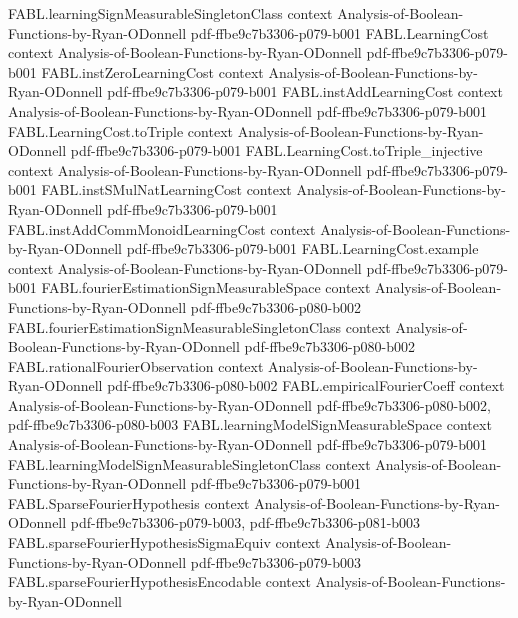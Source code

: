 \begin{theorem}
\proofstep
  {FABL.learningSignMeasurableSingletonClass}
  {context}
  {Analysis-of-Boolean-Functions-by-Ryan-ODonnell}
  {pdf-ffbe9c7b3306-p079-b001}
\proofstep
  {FABL.LearningCost}
  {context}
  {Analysis-of-Boolean-Functions-by-Ryan-ODonnell}
  {pdf-ffbe9c7b3306-p079-b001}
\proofstep
  {FABL.instZeroLearningCost}
  {context}
  {Analysis-of-Boolean-Functions-by-Ryan-ODonnell}
  {pdf-ffbe9c7b3306-p079-b001}
\proofstep
  {FABL.instAddLearningCost}
  {context}
  {Analysis-of-Boolean-Functions-by-Ryan-ODonnell}
  {pdf-ffbe9c7b3306-p079-b001}
\proofstep
  {FABL.LearningCost.toTriple}
  {context}
  {Analysis-of-Boolean-Functions-by-Ryan-ODonnell}
  {pdf-ffbe9c7b3306-p079-b001}
\proofstep
  {FABL.LearningCost.toTriple_injective}
  {context}
  {Analysis-of-Boolean-Functions-by-Ryan-ODonnell}
  {pdf-ffbe9c7b3306-p079-b001}
\proofstep
  {FABL.instSMulNatLearningCost}
  {context}
  {Analysis-of-Boolean-Functions-by-Ryan-ODonnell}
  {pdf-ffbe9c7b3306-p079-b001}
\proofstep
  {FABL.instAddCommMonoidLearningCost}
  {context}
  {Analysis-of-Boolean-Functions-by-Ryan-ODonnell}
  {pdf-ffbe9c7b3306-p079-b001}
\proofstep
  {FABL.LearningCost.example}
  {context}
  {Analysis-of-Boolean-Functions-by-Ryan-ODonnell}
  {pdf-ffbe9c7b3306-p079-b001}
\proofstep
  {FABL.fourierEstimationSignMeasurableSpace}
  {context}
  {Analysis-of-Boolean-Functions-by-Ryan-ODonnell}
  {pdf-ffbe9c7b3306-p080-b002}
\proofstep
  {FABL.fourierEstimationSignMeasurableSingletonClass}
  {context}
  {Analysis-of-Boolean-Functions-by-Ryan-ODonnell}
  {pdf-ffbe9c7b3306-p080-b002}
\proofstep
  {FABL.rationalFourierObservation}
  {context}
  {Analysis-of-Boolean-Functions-by-Ryan-ODonnell}
  {pdf-ffbe9c7b3306-p080-b002}
\proofstep
  {FABL.empiricalFourierCoeff}
  {context}
  {Analysis-of-Boolean-Functions-by-Ryan-ODonnell}
  {pdf-ffbe9c7b3306-p080-b002,
    pdf-ffbe9c7b3306-p080-b003}
\proofstep
  {FABL.learningModelSignMeasurableSpace}
  {context}
  {Analysis-of-Boolean-Functions-by-Ryan-ODonnell}
  {pdf-ffbe9c7b3306-p079-b001}
\proofstep
  {FABL.learningModelSignMeasurableSingletonClass}
  {context}
  {Analysis-of-Boolean-Functions-by-Ryan-ODonnell}
  {pdf-ffbe9c7b3306-p079-b001}
\proofstep
  {FABL.SparseFourierHypothesis}
  {context}
  {Analysis-of-Boolean-Functions-by-Ryan-ODonnell}
  {pdf-ffbe9c7b3306-p079-b003,
    pdf-ffbe9c7b3306-p081-b003}
\proofstep
  {FABL.sparseFourierHypothesisSigmaEquiv}
  {context}
  {Analysis-of-Boolean-Functions-by-Ryan-ODonnell}
  {pdf-ffbe9c7b3306-p079-b003}
\proofstep
  {FABL.sparseFourierHypothesisEncodable}
  {context}
  {Analysis-of-Boolean-Functions-by-Ryan-ODonnell}

\end{theorem}

